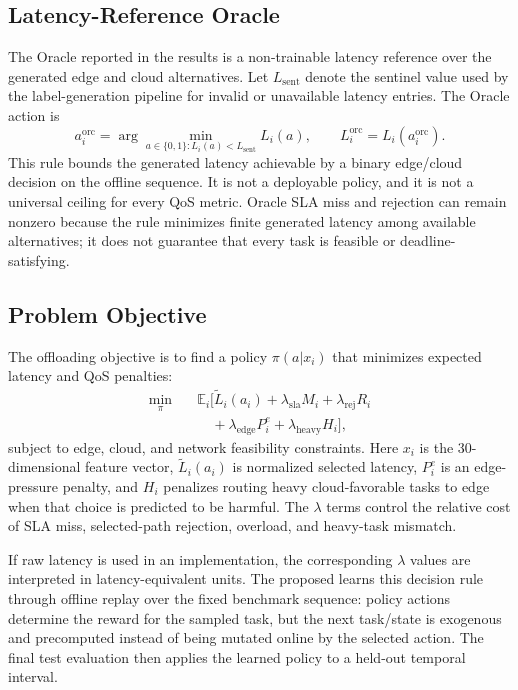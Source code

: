 \subsection{Latency-Reference Oracle}

The Oracle reported in the results is a non-trainable latency reference over the generated edge and cloud alternatives. Let $L_{\mathrm{sent}}$ denote the sentinel value used by the label-generation pipeline for invalid or unavailable latency entries. The Oracle action is
\begin{equation}
a_i^{\mathrm{orc}} =
\arg\min_{a\in\{0,1\}: L_i(a)<L_{\mathrm{sent}}} L_i(a),
\qquad
L_i^{\mathrm{orc}}=L_i(a_i^{\mathrm{orc}}).
\label{eq:oracle_rule}
\end{equation}
This rule bounds the generated latency achievable by a binary edge/cloud decision on the offline sequence. It is not a deployable policy, and it is not a universal ceiling for every QoS metric. Oracle SLA miss and rejection can remain nonzero because the rule minimizes finite generated latency among available alternatives; it does not guarantee that every task is feasible or deadline-satisfying.

\subsection{Problem Objective}

The offloading objective is to find a policy $\pi(a|x_i)$ that minimizes expected latency and QoS penalties:
\begin{equation}
\begin{aligned}
\min_{\pi}\quad &\mathbb{E}_{i}\big[
\tilde{L}_i(a_i)
+\lambda_{\mathrm{sla}}M_i
+\lambda_{\mathrm{rej}}R_i \\
&\quad
+\lambda_{\mathrm{edge}}P^e_i
+\lambda_{\mathrm{heavy}}H_i
\big],
\end{aligned}
\label{eq:objective}
\end{equation}
subject to edge, cloud, and network feasibility constraints. Here $x_i$ is the 30-dimensional feature vector, $\tilde{L}_i(a_i)$ is normalized selected latency, $P^e_i$ is an edge-pressure penalty, and $H_i$ penalizes routing heavy cloud-favorable tasks to edge when that choice is predicted to be harmful. The $\lambda$ terms control the relative cost of SLA miss, selected-path rejection, overload, and heavy-task mismatch.

If raw latency is used in an implementation, the corresponding $\lambda$ values are interpreted in latency-equivalent units. The proposed \fedddqn{} learns this decision rule through offline replay over the fixed benchmark sequence: policy actions determine the reward for the sampled task, but the next task/state is exogenous and precomputed instead of being mutated online by the selected action. The final test evaluation then applies the learned policy to a held-out temporal interval.

